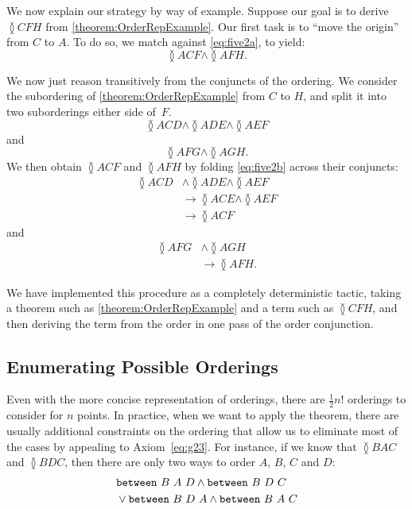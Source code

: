 We now explain our strategy by way of example. Suppose our goal is to derive $\between{C}{F}{H}$ from \eqref{theorem:OrderRepExample}. Our first task is to ``move the origin'' from $C$ to $A$. To do so, we match against \eqref{eq:five2a}, to yield:
\begin{displaymath}
\between{A}{C}{F} \wedge \between{A}{F}{H}.
\end{displaymath}

We now just reason transitively from the conjuncts of the ordering. We consider the subordering of \eqref{theorem:OrderRepExample} from $C$ to $H$, and split it into two suborderings either side of~$F$.
\begin{displaymath}
\between{A}{C}{D} \wedge \between{A}{D}{E} \wedge\between{A}{E}{F}
\end{displaymath}
and
\begin{displaymath}
\between{A}{F}{G}\wedge\between{A}{G}{H}.
\end{displaymath}
We then obtain $\between{A}{C}{F}$ and $\between{A}{F}{H}$ by folding \eqref{eq:five2b} across their conjuncts:
\begin{align*}
\between{A}{C}{D} &\wedge \between{A}{D}{E} \wedge\between{A}{E}{F}\\
&\longrightarrow \between{A}{C}{E} \wedge \between{A}{E}{F}\\
&\longrightarrow \between{A}{C}{F}
\end{align*}
and
\begin{align*}
\between{A}{F}{G} &\wedge \between{A}{G}{H}\\
&\longrightarrow \between{A}{F}{H}.
\end{align*}

We have implemented this procedure as a completely deterministic tactic, taking a theorem such as \eqref{theorem:OrderRepExample} and a term such as $\between{C}{F}{H}$, and then deriving the term from the order in one pass of the order conjunction.

\subsection{Enumerating Possible Orderings}
Even with the more concise representation of orderings, there are $\frac{1}{2}n!$ orderings to consider for $n$ points. In practice, when we want to apply the theorem, there are usually additional constraints on the ordering that allow us to eliminate most of the cases by appealing to Axiom~\ref{eq:g23}. For instance, if we know that $\between{B}{A}{C}$ and $\between{B}{D}{C}$, then there are only two ways to order $A$, $B$, $C$ and $D$:
\begin{align*}
&\texttt{between}\ B\ A\ D\wedge\texttt{between}\ B\ D\ C\\
&\vee\texttt{between}\ B\ D\ A\wedge\texttt{between}\ B\ A\ C
\end{align*}

